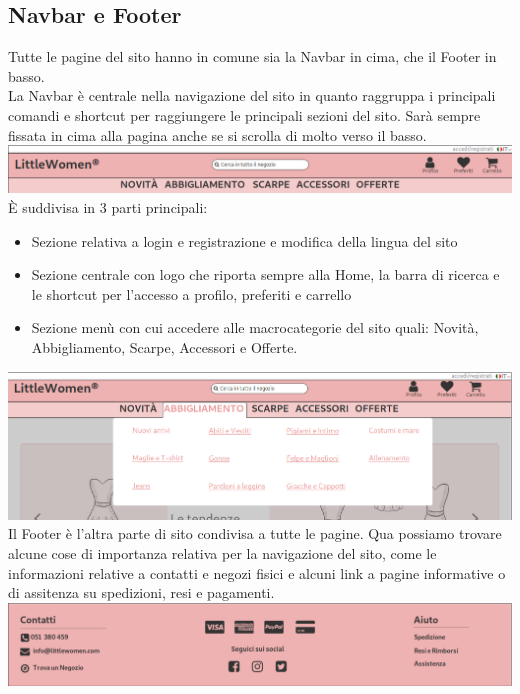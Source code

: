 \documentclass[12pt,a4paper]{report}
\begin{document}
\subsection{Navbar e Footer} Tutte le pagine del sito hanno in comune sia la Navbar in cima, che il Footer in basso.\\
La Navbar è centrale nella navigazione del sito in quanto raggruppa i principali comandi e shortcut per raggiungere le principali sezioni del sito. Sarà sempre fissata in cima alla pagina anche se si scrolla di molto verso il basso.\\
\includegraphics[width=\textwidth]{"Images Latex/Immagini Wireframe/Desktop/1 - Navbar"}\\
È suddivisa in 3 parti principali:
\begin{itemize}
  \item Sezione relativa a login e registrazione e modifica della lingua del sito
  \item Sezione centrale con logo che riporta sempre alla Home, la barra di ricerca e le shortcut per l'accesso a profilo, preferiti e carrello
  \item Sezione menù con cui accedere alle macrocategorie del sito quali: Novità, Abbigliamento, Scarpe, Accessori e Offerte.
\end{itemize}
\includegraphics[width=\textwidth]{"Images Latex/Immagini Wireframe/Desktop/4 - Navbar Menu"}
\vspace{5mm}\\
Il Footer è l'altra parte di sito condivisa a tutte le pagine. Qua possiamo trovare alcune cose di importanza relativa per la navigazione del sito, come le informazioni relative a contatti e negozi fisici e alcuni link a pagine informative o di assitenza su spedizioni, resi e pagamenti.\\
\includegraphics[width=\textwidth]{"Images Latex/Immagini Wireframe/Desktop/1 - Footer"}
\newpage
\end{document}
